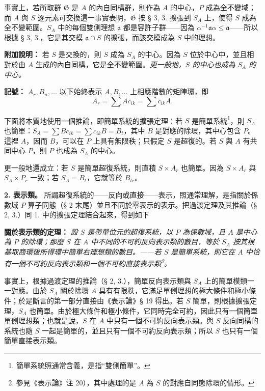 \documentclass[11pt]{article}
\providecommand{\glqq}{“}
\providecommand{\grqq}{”}
\providecommand{\frG}{\mathfrak G}
\begin{document}
事實上，若所取群 \(\frG\) 是 \(A\) 的內自同構群，則作為 \(A\) 的中心，\(P\) 成為全不變域；而 \(A\) 與 \(S\) 逐元素可交換這一事實表明，\(\frG\) 按 § 3, 3. 擴張到 \(S_A\) 上，使得 \(S\) 成為全不變範圍。\(S_A\) 中的每個雙側理想 \(\mathfrak a\) 都是容許子群——因為 \(\alpha^{-1}\mathfrak a\alpha\leq\mathfrak a\)——所以根據 § 3, 3.，它是其交模 \(\mathfrak a\cap S\) 的擴張，而該交模成為 \(S\) 中的理想。

\noindent\textbf{附加說明：} 若 \(S\) 是交換的，則 \(S\) 成為 \(S_A\) 的中心。因為 \(S\) 位於中心中，並且相對於由 \(A\) 生成的內自同構，它是全不變範圍。\emph{更一般地，\(S\) 的中心也成為 \(S_A\) 的中心。}

\noindent\textbf{記號：} \(A_r,B_n,\ldots\) 以下始終表示 \(A,B,\ldots\) 上相應階數的矩陣環，即
\[
        A_r=\sum A c_{ik}=\sum c_{ik}A.
\]

下面將本質地使用一個推論，即簡單系統的擴張定理：若 \(S\) 是簡單系統\footnote{簡單系統照通常含義，是指\glqq{}雙側簡單\grqq{}。}，則 \(S_A\) 也簡單：\(S_A=\sum B c_{ik}=\sum c_{ik}B=B_t\)，其中 \(B\) 是對應的除環，其中心包含 \(P\)。這裡 \(A\)，因而 \(B\)，可以在 \(P\) 上具有無限秩；只假定 \(S\) 是超復的。若 \(S\) 與 \(A\) 有共同中心 \(P\)，則 \(P\) 也成為 \(S_A\) 的中心。

更一般地還成立：若 \(S\) 是簡單超復系統，則直積 \(S\times A_r\) 也簡單。因為 \(S\times A_r\) 與 \(S_A\times P_r\) 一致；若 \(S_A=B_t\)，它就等於 \(B_{tr}\)。

\noindent\textbf{2. 表示類。} 所謂超復系統的——反向或直接——表示，照通常理解，是指關於係數域 \(P\) 算子同態（§ 2 末尾）並且不同於零表示的表示。把過渡定理及其推論（§ 2, 3.）同 1. 中的擴張定理結合起來，得到如下

\noindent\textbf{關於表示類的定理：} \emph{設 \(S\) 是帶單位元的超復系統，以 \(P\) 為係數域，且 \(A\) 是中心為 \(P\) 的除環；那麼 \(S\) 在 \(A\) 中不同的不可約反向表示類的數目，等於 \(S_A\) 按其根基取商環後所得環中簡單右理想類的數目。——若 \(S\) 是簡單系統，則它在 \(A\) 中恰有一個不可約反向表示類和一個不可約直接表示類\footnote{\normalfont 參見《表示論》注 20），其中處理的是 \(A\) 為 \(S\) 的對應自同態除環的情形。}。}

事實上，根據過渡定理的推論（§ 2, 3.），簡單反向表示類與 \(S_A\) 上的簡單模類一一對應。由於 \(S_A\) 關於除環 \(A\) 具有有限秩，它滿足單側理想的極大條件和極小條件；於是斷言的第一部分直接由《表示論》§ 19 得出。若 \(S\) 簡單，則根據擴張定理，\(S_A\) 也簡單。由於極大條件和極小條件，它同時完全可約，因此只有一個簡單單側理想類；也就是說，\(S\) 在 \(A\) 中只有一個不可約反向表示類。與 \(S\) 反向同構的系統也隨 \(S\) 一起是簡單的，並且只有一個不可約反向表示類；所以 \(S\) 也只有一個簡單直接表示類。
\end{document}
